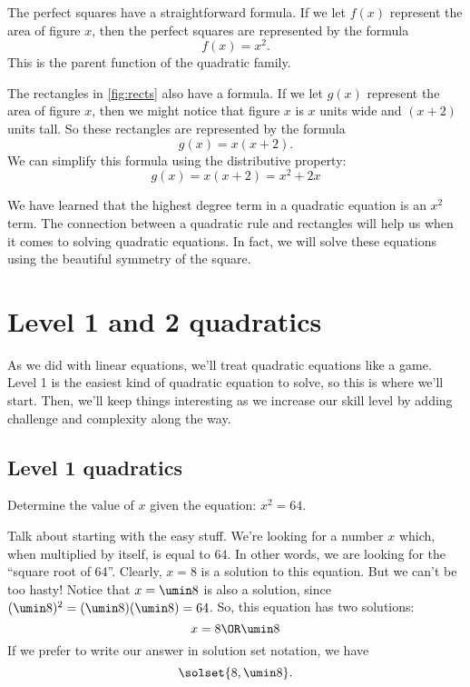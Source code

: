 The perfect squares have a straightforward formula. If we let $f(x)$ represent the area of figure $x$, then the perfect squares are represented by the formula
\[f(x)=x^2.\]
This is the parent function of the quadratic family.

The rectangles in \cref{fig:rects} also have a formula. If we let $g(x)$ represent the area of figure $x$, then we might notice that figure $x$ is $x$ units wide and $(x+2)$ units tall. So these rectangles are represented by the formula
\[g(x) = x(x+2).\]
We can simplify this formula using the distributive property:
\[g(x) = x(x+2) = x^2 + 2x\]

We have learned that the highest degree term in a quadratic equation is an $x^2$ term. The connection between a quadratic rule and rectangles will help us when it comes to solving quadratic equations. In fact, we will solve these equations using the beautiful symmetry of the square.

\section{Level 1 and 2 quadratics}

As we did with linear equations, we'll treat quadratic equations like a game. Level 1 is the easiest kind of quadratic equation to solve, so this is where we'll start. Then, we'll keep things interesting as we increase our skill level by adding challenge and complexity along the way.

\subsection{Level 1 quadratics}

\begin{boxedexplore}
Determine the value of $x$ given the equation: $x^2 = 64$.
\end{boxedexplore} %

Talk about starting with the easy stuff. We're looking for a number $x$ which, when multiplied by itself, is equal to 64. In other words, we are looking for the ``square root of 64''. Clearly, $x=8$ is a solution to this equation. But we can't be too hasty! Notice that $x=\umin8$ is also a solution, since $(\umin8)^2 = (\umin8)(\umin8) = 64$. So, this equation has two solutions:
\[x = 8 \OR \umin8\]
If we prefer to write our answer in solution set notation, we have \[\solset{8,\umin8}.\]

